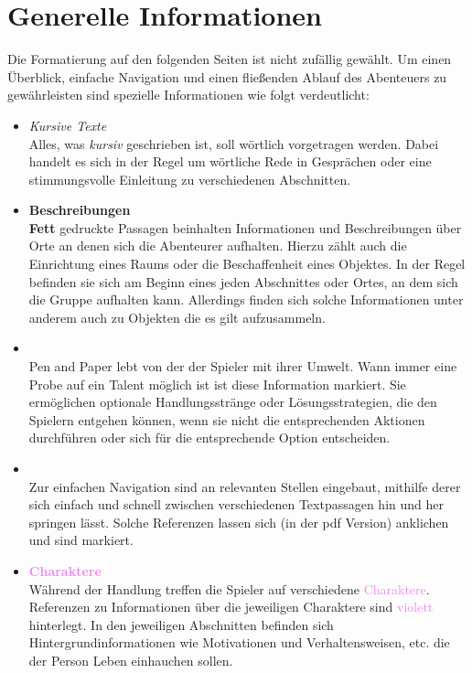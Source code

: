 \thispagestyle{fancy-info}
\section*{Generelle Informationen}

Die Formatierung auf den folgenden Seiten ist nicht zufällig gewählt. Um einen Überblick, einfache Navigation und
einen fließenden Ablauf des Abenteuers zu gewährleisten sind spezielle Informationen wie folgt verdeutlicht:

\begin{itemize}
  \item \textit{Kursive Texte} \\
  Alles, was \textit{kursiv} geschrieben ist, soll wörtlich vorgetragen werden. Dabei handelt es sich in der Regel
  um wörtliche Rede in Gesprächen oder eine stimmungsvolle Einleitung zu verschiedenen Abschnitten.

  \item \textbf{Beschreibungen} \\
  \textbf{Fett} gedruckte Passagen beinhalten Informationen und Beschreibungen über Orte an denen sich die
  Abenteurer aufhalten. Hierzu zählt auch die Einrichtung eines Raums oder die Beschaffenheit eines Objektes.
  In der Regel befinden sie sich am Beginn eines jeden Abschnittes oder Ortes, an dem sich die Gruppe aufhalten
  kann. Allerdings finden sich solche Informationen unter anderem auch zu Objekten die es gilt aufzusammeln.

  \item {} \\
  Pen and Paper lebt von der  der Spieler mit ihrer Umwelt. Wann immer eine Probe auf ein Talent
  möglich ist ist diese Information  markiert. Sie ermöglichen optionale Handlungsstränge oder
  Lösungsstrategien, die den Spielern entgehen können, wenn sie nicht die entsprechenden Aktionen durchführen oder
  sich für die entsprechende Option entscheiden.

  \item {} \\
  Zur einfachen Navigation sind an relevanten Stellen  eingebaut, mithilfe derer sich einfach und
  schnell zwischen verschiedenen Textpassagen hin und her springen lässt. Solche Referenzen lassen sich (in der pdf
  Version) anklichen und sind  markiert.

  \item \textcolor{violet}{\textbf{Charaktere}} \\
  Während der Handlung treffen die Spieler auf verschiedene \textcolor{violet}{Charaktere}. Referenzen zu Informationen über
  die jeweiligen Charaktere sind \textcolor{violet}{violett} hinterlegt. In den jeweiligen Abschnitten befinden sich
  Hintergrundinformationen wie Motivationen und Verhaltensweisen, etc. die der Person Leben einhauchen sollen.

\end{itemize}
